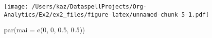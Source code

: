 \documentclass[
]{article}
\newenvironment{Shaded}{\begin{snugshade}}{\end{snugshade}}
\newcommand{\AttributeTok}[1]{\textcolor[rgb]{0.77,0.63,0.00}{#1}}
\newcommand{\DecValTok}[1]{\textcolor[rgb]{0.00,0.00,0.81}{#1}}
\newcommand{\FloatTok}[1]{\textcolor[rgb]{0.00,0.00,0.81}{#1}}
\newcommand{\FunctionTok}[1]{\textcolor[rgb]{0.00,0.00,0.00}{#1}}
\newcommand{\NormalTok}[1]{#1}
\begin{document}
\texttt{[image: /Users/kaz/DataspellProjects/Org-Analytics/Ex2/ex2\_files/figure-latex/unnamed-chunk-5-1.pdf]}

\begin{Shaded}
\begin{Highlighting}[]
\FunctionTok{par}\NormalTok{(}\AttributeTok{mai =} \FunctionTok{c}\NormalTok{(}\DecValTok{0}\NormalTok{, }\DecValTok{0}\NormalTok{, }\FloatTok{0.5}\NormalTok{, }\FloatTok{0.5}\NormalTok{))}
\end{Highlighting}
\end{Shaded}
\end{document}
